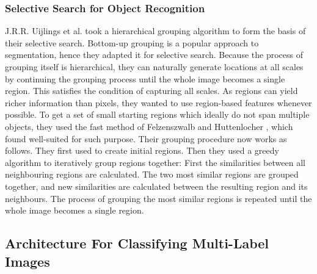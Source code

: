\subsubsection{Selective Search for Object Recognition}

J.R.R. Uijlings et al. \cite{2} took a hierarchical grouping algorithm to form the basis of their
selective search. Bottom-up grouping is a popular approach to segmentation, hence they adapted it for selective search. Because
the process of grouping itself is hierarchical, they can naturally generate locations at all scales by continuing the grouping process until
the whole image becomes a single region. This satisfies the condition of capturing all scales.
As regions can yield richer information than pixels, they wanted to
use region-based features whenever possible. To get a set of small
starting regions which ideally do not span multiple objects, they used the fast method of Felzenszwalb and Huttenlocher \cite{7}, which
found well-suited for such purpose.
Their grouping procedure now works as follows. They first used \cite{7}
to create initial regions. Then they used a greedy algorithm to iteratively group regions together: First the similarities between all
neighbouring regions are calculated. The two most similar regions
are grouped together, and new similarities are calculated between
the resulting region and its neighbours. The process of grouping
the most similar regions is repeated until the whole image becomes
a single region.


\subsection{Architecture For Classifying Multi-Label Images}

